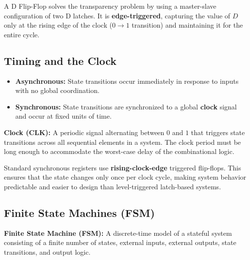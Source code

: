 \begin{definition}
A D Flip-Flop solves the transparency problem by using a master-slave configuration of two D latches. It is \textbf{edge-triggered}, capturing the value of $D$ only at the rising edge of the clock ($0 \rightarrow 1$ transition) and maintaining it for the entire cycle.
\end{definition}


\subsection{Timing and the Clock}

\begin{definition}
\begin{itemize}
    \item \textbf{Asynchronous:} State transitions occur immediately in response to inputs with no global coordination.
    \item \textbf{Synchronous:} State transitions are synchronized to a global \textbf{clock} signal and occur at fixed units of time.
\end{itemize}
\end{definition}

\begin{definition}
\textbf{Clock (CLK):} A periodic signal alternating between $0$ and $1$ that triggers state transitions across all sequential elements in a system. The clock period must be long enough to accommodate the worst-case delay of the combinational logic.
\end{definition}

\begin{important}
Standard synchronous registers use \textbf{rising-clock-edge} triggered flip-flops. This ensures that the state changes only once per clock cycle, making system behavior predictable and easier to design than level-triggered latch-based systems.
\end{important}

\subsection{Finite State Machines (FSM)}

\begin{definition}
\textbf{Finite State Machine (FSM):} A discrete-time model of a stateful system consisting of a finite number of states, external inputs, external outputs, state transitions, and output logic. 
\end{definition}

